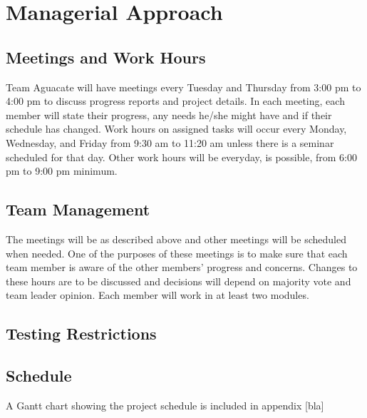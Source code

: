 \section{Managerial Approach}

\subsection{Meetings and Work Hours}
Team Aguacate will have meetings every Tuesday and Thursday from 3:00 pm to 4:00 pm to discuss progress reports and project details.  In each meeting, each member will state their progress, any needs he/she might have and if their schedule has changed.  Work hours on assigned tasks will occur every Monday, Wednesday, and Friday from 9:30 am to 11:20 am unless there is a seminar scheduled for that day.  Other work hours will be everyday, is possible, from 6:00 pm to 9:00 pm minimum.

\subsection{Team Management}
The meetings will be as described above and other meetings will be scheduled when needed.  One of the purposes of these meetings is to make sure that each team member is aware of the other members' progress and concerns.  Changes to these hours are to be discussed and decisions will depend on majority vote and team leader opinion.  Each member will work in at least two modules.

\subsection{Testing Restrictions}
\subsection{Schedule}
A Gantt chart showing the project schedule is included in appendix [bla] 